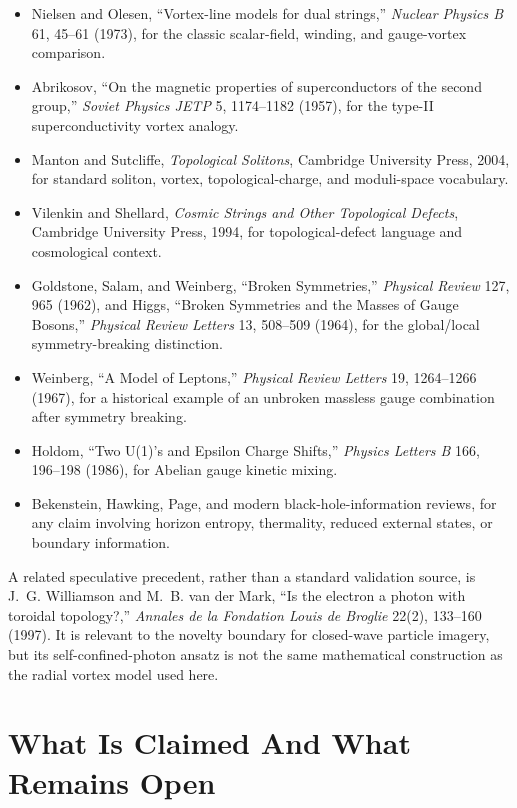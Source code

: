 \documentclass[11pt,a4paper]{article}
\begin{document}
\begin{itemize}
\item Nielsen and Olesen, ``Vortex-line models for dual strings,'' \textit{Nuclear Physics B} 61, 45--61 (1973), for the classic scalar-field, winding, and gauge-vortex comparison.
\item Abrikosov, ``On the magnetic properties of superconductors of the second group,'' \textit{Soviet Physics JETP} 5, 1174--1182 (1957), for the type-II superconductivity vortex analogy.
\item Manton and Sutcliffe, \textit{Topological Solitons}, Cambridge University Press, 2004, for standard soliton, vortex, topological-charge, and moduli-space vocabulary.
\item Vilenkin and Shellard, \textit{Cosmic Strings and Other Topological Defects}, Cambridge University Press, 1994, for topological-defect language and cosmological context.
\item Goldstone, Salam, and Weinberg, ``Broken Symmetries,'' \textit{Physical Review} 127, 965 (1962), and Higgs, ``Broken Symmetries and the Masses of Gauge Bosons,'' \textit{Physical Review Letters} 13, 508--509 (1964), for the global/local symmetry-breaking distinction.
\item Weinberg, ``A Model of Leptons,'' \textit{Physical Review Letters} 19, 1264--1266 (1967), for a historical example of an unbroken massless gauge combination after symmetry breaking.
\item Holdom, ``Two U(1)'s and Epsilon Charge Shifts,'' \textit{Physics Letters B} 166, 196--198 (1986), for Abelian gauge kinetic mixing.
\item Bekenstein, Hawking, Page, and modern black-hole-information reviews, for any claim involving horizon entropy, thermality, reduced external states, or boundary information.
\end{itemize}

A related speculative precedent, rather than a standard validation source, is J.~G. Williamson and M.~B. van der Mark, ``Is the electron a photon with toroidal topology?,'' \textit{Annales de la Fondation Louis de Broglie} 22(2), 133--160 (1997). It is relevant to the novelty boundary for closed-wave particle imagery, but its self-confined-photon ansatz is not the same mathematical construction as the radial vortex model used here.

\section{What Is Claimed And What Remains Open}
\end{document}
